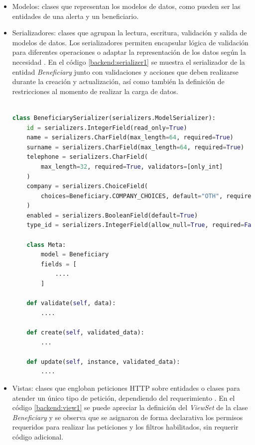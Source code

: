 \begin{itemize}
	\item Modelos: clases que representan los modelos de datos, como pueden ser las entidades de una alerta y un beneficiario.
	\item Serializadores: clases que agrupan la lectura, escritura, validación y salida de modelos de datos. Los serializadores permiten encapsular lógica de validación para diferentes operaciones o adaptar la representación de los datos según la necesidad \citep{DJANGO:8}. En el código \ref{backend:serializer1} se muestra el serializador de la entidad \textit{Beneficiary} junto con validaciones y acciones que deben realizarse durante la creación y actualización, así como también la definición de restricciones al momento de realizar la carga de datos.

\pagebreak

\begin{lstlisting}[language=Python,label=backend:serializer1,caption=Serializador de la entidad \textit{Beneficiary}.]  % Start your code-block

class BeneficiarySerializer(serializers.ModelSerializer):
    id = serializers.IntegerField(read_only=True)
    name = serializers.CharField(max_length=64, required=True)
    surname = serializers.CharField(max_length=64, required=True)
    telephone = serializers.CharField(
        max_length=32, required=True, validators=[only_int]
    )
    company = serializers.ChoiceField(
        choices=Beneficiary.COMPANY_CHOICES, default="OTH", required=False
    )
    enabled = serializers.BooleanField(default=True)
    type_id = serializers.IntegerField(allow_null=True, required=False)

    class Meta:
        model = Beneficiary
        fields = [
            ....
        ]

    def validate(self, data):
        ....

    def create(self, validated_data):
        ...

    def update(self, instance, validated_data):
        ....
\end{lstlisting}

	\item Vistas: clases que engloban peticiones HTTP sobre entidades o clases para atender un único tipo de petición, dependiendo del requerimiento \citep{DJANGO:9}. En el código \ref{backend:view1} se puede apreciar la definición del \textit{ViewSet} de la clase \textit{Beneficiary} y se observa que se asignaron de forma declarativa los permisos requeridos para realizar las peticiones y los filtros habilitados, sin requerir código adicional.
	

\end{itemize}
